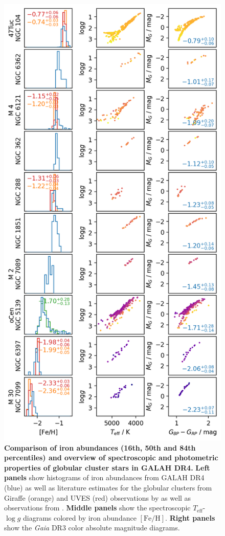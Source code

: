 \documentclass[
  journal=pasa,
  manuscript=research-paper, %
  year=2024,
  volume=37
]{cup-journal}
\newcommand{\Teff}{$T_\mathrm{eff}$\xspace}
\newcommand{\logg}{$\log g$\xspace}
\newcommand{\feh}{$\mathrm{[Fe/H]}$\xspace}
\newcommand{\Gaia}{\textit{Gaia}\xspace}
\begin{document}
\begin{figure}
 \centering
 \includegraphics[width=\textwidth]{figures/galah_dr4_allstar_globular_cluster_feh_comparison.png}
 \caption{\textbf{Comparison of iron abundances (16th, 50th and 84th percentiles) and overview of spectroscopic and photometric properties of globular cluster stars in GALAH DR4.}
 \textbf{Left panels} show histograms of iron abundances from GALAH DR4 (blue) as well as literature estimates for the globular clusters from Giraffe (orange) and UVES (red) observations by \citep{Carretta2009, Carretta2009c} as well as observations from \cite{Johnson2010}.
 \textbf{Middle panels} show the spectroscopic \Teff-\logg diagrams colored by iron abundance \feh.
 \textbf{Right panels} show the \Gaia DR3 color absolute magnitude diagrams.
}
 \label{fig:galah_dr4_allstar_globular_cluster_feh_comparison}
\end{figure}
\end{document}
